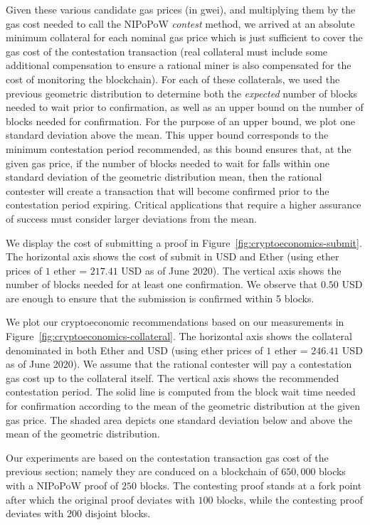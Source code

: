 Given these various candidate gas prices (in gwei), and multiplying them by the gas cost
needed to call the NIPoPoW \emph{contest} method, we arrived at an absolute minimum collateral
for each nominal gas price
which is just sufficient to cover the gas cost of the contestation transaction
(real collateral must include some additional compensation to ensure a rational miner
is also compensated for the cost of monitoring the blockchain). For each
of these collaterals, we used the previous geometric distribution to determine both the
\emph{expected} number of blocks needed to wait prior to confirmation, as well as an
upper bound on the number of blocks needed for confirmation. For the purpose of an upper bound, we
plot one standard deviation above the mean. This upper bound corresponds to the minimum
contestation period recommended, as this bound ensures that, at the given gas price,
if the number of blocks needed to wait for falls within one standard deviation of
the geometric distribution mean, then the rational contester will create a transaction that
will become confirmed prior to the contestation period expiring. Critical applications
that require a higher assurance of success must consider larger deviations from the
mean.

We display the cost of submitting a proof in
Figure~\ref{fig:cryptoeconomics-submit}. The horizontal axis shows the cost of
submit in USD and Ether (using ether prices of $1$ ether = $217.41$
USD as of June 2020). The vertical axis shows the number of blocks needed for
at least one confirmation. We observe that $0.50$ USD are
enough to ensure that the submission is confirmed within 5 blocks.

We plot our cryptoeconomic recommendations based on our measurements in
Figure~\ref{fig:cryptoeconomics-collateral}. The horizontal axis shows the collateral denominated in
both Ether and USD (using ether prices of $1$ ether = $246.41$ USD as of June 2020).
We assume that the rational contester will pay a contestation gas cost up to the
collateral itself. The vertical axis shows the recommended contestation period.
The solid line is computed from the block wait time needed for confirmation
according to the mean of the geometric distribution at the given gas price.
The shaded area depicts one standard deviation below and above the mean of
the geometric distribution.

Our experiments are based on the contestation transaction gas cost of the previous
section; namely they are conduced on a blockchain of $650{,}000$ blocks with a NIPoPoW
proof of $250$ blocks. The contesting proof stands at a fork point after which the
original proof deviates with $100$ blocks, while the contesting proof deviates with
$200$ disjoint blocks.

